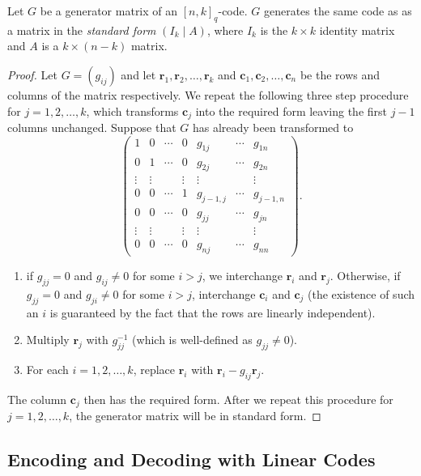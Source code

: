 \begin{theorem}
    Let $G$ be a generator matrix of an $[n,k]_q$-code. $G$ generates the same code as as a matrix in the \textit{standard form} $(I_k\mid A)$, where $I_k$ is the $k\times k$ identity matrix and $A$ is a $k\times (n-k)$ matrix.
\end{theorem}
\begin{proof}
    Let $G=(g_{ij})$ and let $\textbf{r}_1,\textbf{r}_2,\ldots,\textbf{r}_k$ and $\textbf{c}_1,\textbf{c}_2,\ldots,\textbf{c}_n$ be the rows and columns of the matrix respectively. We repeat the following three step procedure for $j=1,2,\ldots,k$, which transforms $\textbf{c}_j$ into the required form leaving the first $j-1$ columns unchanged. Suppose that $G$ has already been transformed to
    $$
    \begin{pmatrix}
    1 & 0 & \cdots & 0 & g_{1j} & \cdots & g_{1n} \\
    0 & 1 & \cdots & 0 & g_{2j} & \cdots & g_{2n} \\
    \vdots & \vdots &  & \vdots & \vdots & & \vdots \\
    0 & 0 & \cdots & 1 & g_{j-1,j} & \cdots & g_{j-1,n} \\
    0 & 0 & \cdots & 0 & g_{jj} & \cdots & g_{jn} \\
    \vdots & \vdots & & \vdots & \vdots & & \vdots \\
    0 & 0 & \cdots & 0 & g_{nj} & \cdots & g_{nn}
    \end{pmatrix}.
    $$
    \begin{enumerate}
        \item if $g_{jj}=0$ and $g_{ij}\neq 0$ for some $i>j$, we interchange $\textbf{r}_i$ and $\textbf{r}_j$. Otherwise, if $g_{jj}=0$ and $g_{ji}\neq 0$ for some $i>j$, interchange $\textbf{c}_i$ and $\textbf{c}_j$ (the existence of such an $i$ is guaranteed by the fact that the rows are linearly independent).
        \item Multiply $\textbf{r}_j$ with $g_{jj}^{-1}$ (which is well-defined as $g_{jj}\neq 0$).
        \item For each $i=1,2,\ldots,k$, replace $\textbf{r}_i$ with $\textbf{r}_i-g_{ij}\textbf{r}_j$.
    \end{enumerate}
    The column $\textbf{c}_j$ then has the required form. After we repeat this procedure for $j=1,2,\ldots,k$, the generator matrix will be in standard form.
\end{proof}

\subsection{Encoding and Decoding with Linear Codes}

